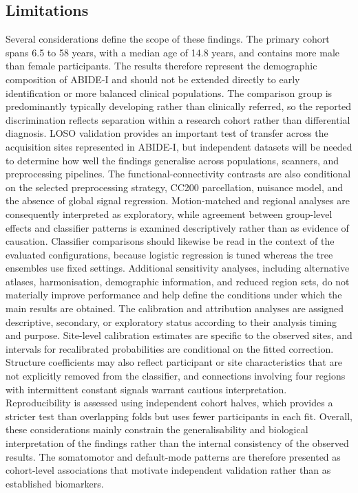 \subsection{Limitations}
\label{subsec:limitations}

Several considerations define the scope of these findings. The primary cohort spans 6.5 to 58 years, with a median age of 14.8 years, and contains more male than female participants. The results therefore represent the demographic composition of ABIDE-I and should not be extended directly to early identification or more balanced clinical populations. The comparison group is predominantly typically developing rather than clinically referred, so the reported discrimination reflects separation within a research cohort rather than differential diagnosis. LOSO validation provides an important test of transfer across the acquisition sites represented in ABIDE-I, but independent datasets will be needed to determine how well the findings generalise across populations, scanners, and preprocessing pipelines. The functional-connectivity contrasts are also conditional on the selected preprocessing strategy, CC200 parcellation, nuisance model, and the absence of global signal regression. Motion-matched and regional analyses are consequently interpreted as exploratory, while agreement between group-level effects and classifier patterns is examined descriptively rather than as evidence of causation. Classifier comparisons should likewise be read in the context of the evaluated configurations, because logistic regression is tuned whereas the tree ensembles use fixed settings. Additional sensitivity analyses, including alternative atlases, harmonisation, demographic information, and reduced region sets, do not materially improve performance and help define the conditions under which the main results are obtained. The calibration and attribution analyses are assigned descriptive, secondary, or exploratory status according to their analysis timing and purpose. Site-level calibration estimates are specific to the observed sites, and intervals for recalibrated probabilities are conditional on the fitted correction. Structure coefficients may also reflect participant or site characteristics that are not explicitly removed from the classifier, and connections involving four regions with intermittent constant signals warrant cautious interpretation. Reproducibility is assessed using independent cohort halves, which provides a stricter test than overlapping folds but uses fewer participants in each fit. Overall, these considerations mainly constrain the generalisability and biological interpretation of the findings rather than the internal consistency of the observed results. The somatomotor and default-mode patterns are therefore presented as cohort-level associations that motivate independent validation rather than as established biomarkers.

